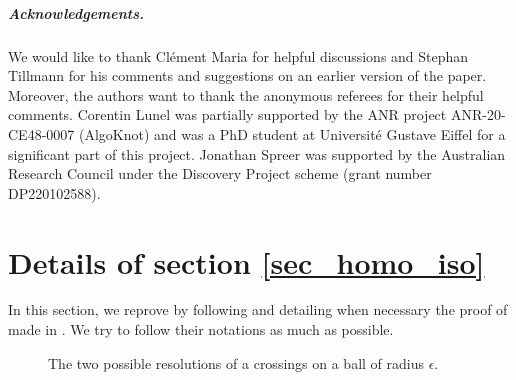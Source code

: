 \documentclass{article}
\begin{document}
\subparagraph*{Acknowledgements.}
We would like to thank Cl\'ement Maria for helpful discussions and 
Stephan Tillmann for his comments and suggestions on an earlier version of the paper. 
Moreover, the authors want to thank the anonymous referees for their helpful comments.
Corentin Lunel was partially supported by the ANR project ANR-20-CE48-0007 (AlgoKnot) and was a PhD student at Université Gustave Eiffel for a significant part of this project. 
Jonathan Spreer was supported by the Australian Research Council under the Discovery Project scheme (grant number DP220102588).





\appendix

\section{Details of section \ref{sec_homo_iso}}
\label{sec_chambers_appendix}

In this section, we reprove  by following and detailing when necessary the proof of  made in \cite[Section 2]{Chambers_homo-isotopy}. We try to follow their notations as much as possible. 

\begin{figure}[ht]
\begin{center}
\caption{The two possible resolutions of a crossings on a ball of radius $\epsilon$.}
\label{pic_reso_def}
\end{center}
\end{figure}
\end{document}
